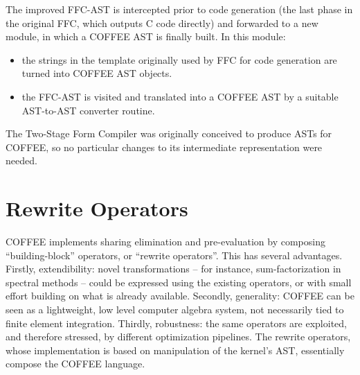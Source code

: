 The improved FFC-AST is intercepted prior to code generation (the last phase in the original FFC, which outputs C code directly) and forwarded to a new module, in which a COFFEE AST is finally built. In this module:
\begin{itemize}
\item the strings in the template originally used by FFC for code generation are turned into COFFEE AST objects.
\item the FFC-AST is visited and translated into a COFFEE AST by a suitable AST-to-AST converter routine.
\end{itemize}

The Two-Stage Form Compiler was originally conceived to produce ASTs for COFFEE, so no particular changes to its intermediate representation were needed. 


\section{Rewrite Operators}
\label{sec:coffee:rewrite-ops}
COFFEE implements sharing elimination and pre-evaluation by composing ``building-block'' operators, or ``rewrite operators''. This has several advantages. Firstly, extendibility: novel transformations -- for instance, sum-factorization in spectral methods -- could be expressed using the existing operators, or with small effort building on what is already available. Secondly, generality: COFFEE can be seen as a lightweight, low level computer algebra system, not necessarily tied to finite element integration. Thirdly, robustness: the same operators are exploited, and therefore stressed, by different optimization pipelines. The rewrite operators, whose implementation is based on manipulation of the kernel's AST, essentially compose the COFFEE language. 

